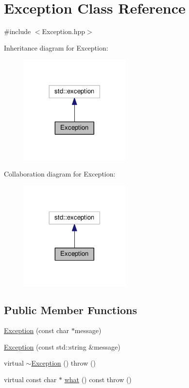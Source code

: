 \hypertarget{class_exception}{}\section{Exception Class Reference}
\label{class_exception}


{\ttfamily \#include $<$Exception.\+hpp$>$}



Inheritance diagram for Exception\+:
\nopagebreak
\begin{figure}[H]
\begin{center}
\leavevmode
\includegraphics[width=158pt]{class_exception__inherit__graph}
\end{center}
\end{figure}


Collaboration diagram for Exception\+:
\nopagebreak
\begin{figure}[H]
\begin{center}
\leavevmode
\includegraphics[width=158pt]{class_exception__coll__graph}
\end{center}
\end{figure}
\subsection*{Public Member Functions}
\begin{DoxyCompactItemize}
\item 
\hyperlink{class_exception_ac541ead5c20548813d7dea73c28c7fab}{Exception} (const char $\ast$message)
\item 
\hyperlink{class_exception_a472b7904dadf1047ba48c23741888456}{Exception} (const std\+::string \&message)
\item 
virtual \hyperlink{class_exception_ad1ba411de295ef2eeb02ba26284a829a}{$\sim$\+Exception} ()  throw ()
\item 
virtual const char $\ast$ \hyperlink{class_exception_a78154a31544a609cbd226d32574f52cd}{what} () const   throw ()
\end{DoxyCompactItemize}
